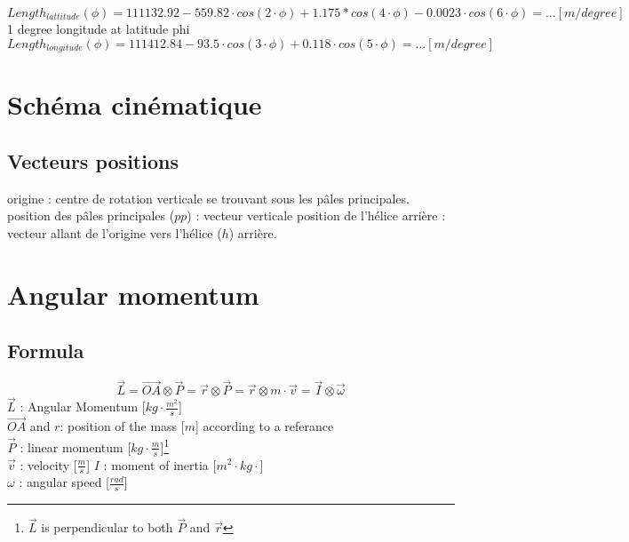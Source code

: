 \documentclass[12pt,a4paper]{article}
\begin{document}
\begin{equation}
	Length_{lattitude}(\phi) = 111132.92-559.82 \cdot cos(2 \cdot \phi)+1.175*cos(4 \cdot \phi)-0.0023 \cdot cos(6 \cdot \phi)= ... [m/degree]
\end{equation}
 1 degree longitude at latitude phi
\begin{equation}
	Length_{longitude}(\phi) =
	111412.84-93.5 \cdot cos(3 \cdot \phi)+ 0.118 \cdot cos(5 \cdot \phi)= ... [m/degree]
\end{equation}

\newpage
\section{Schéma cinématique}


\subsection{Vecteurs positions}
origine : centre de rotation verticale se trouvant sous les pâles principales.
\medbreak
position  des pâles principales ($pp$) : vecteur verticale
\medbreak
position de l'hélice arrière : 
vecteur allant de l'origine vers l'hélice ($h$) arrière. 


\newpage
\section{Angular momentum}

\subsection{Formula}
\begin{equation}
\vec{L}=\vec{OA} \otimes \vec{P}=\vec{r} \otimes \vec{P}=\vec{r} \otimes m \cdot \vec{v}=\vec{I} \otimes \vec{\omega}
\end{equation}
$\vec{L}$ : Angular Momentum [$kg \cdot \frac{m^2}{s}$]\\
$\vec{OA}$ and $r$: position of the mass [$m$] according to a referance\\
$\vec{P}$ : linear momentum [$kg\cdot \frac{m}{s}$]\footnote{$\vec{L}$ is perpendicular to both $\vec{P}$ and $\vec{r}$}\\
$\vec{v}$ : velocity [$\frac{m}{s}$]
$I$ : moment of inertia [$m^2 \cdot kg \cdot$]\\
$\omega$ : angular speed [$\frac{rad}{s}$]
\end{document}
